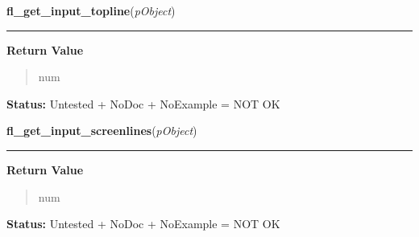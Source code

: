     \vspace{0.5ex}

\hspace{.8\funcindent}\begin{boxedminipage}{\funcwidth}

    \raggedright \textbf{fl\_get\_input\_topline}(\textit{pObject})

    \vspace{-1.5ex}

    \rule{\textwidth}{0.5\fboxrule}
\setlength{\parskip}{2ex}
\setlength{\parskip}{1ex}
      \textbf{Return Value}
    \vspace{-1ex}

      \begin{quote}
      num

      \end{quote}

\textbf{Status:} Untested + NoDoc + NoExample = NOT OK



    \end{boxedminipage}

    \label{xformslib:library:fl_get_input_screenlines}

    \vspace{0.5ex}

\hspace{.8\funcindent}\begin{boxedminipage}{\funcwidth}

    \raggedright \textbf{fl\_get\_input\_screenlines}(\textit{pObject})

    \vspace{-1.5ex}

    \rule{\textwidth}{0.5\fboxrule}
\setlength{\parskip}{2ex}
\setlength{\parskip}{1ex}
      \textbf{Return Value}
    \vspace{-1ex}

      \begin{quote}
      num

      \end{quote}

\textbf{Status:} Untested + NoDoc + NoExample = NOT OK



    \end{boxedminipage}

    \label{xformslib:library:fl_get_input_cursorpos}

